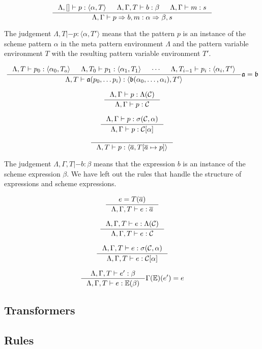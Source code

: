 \[
\inference{\Lambda, [] |- p : \langle \alpha, T \rangle &
  \Lambda, \Gamma, T |- b : \beta &
\Lambda, \Gamma |- m : s}
{\Lambda, \Gamma |- p => b, m : \alpha => \beta, s}
\]

The judgement $\Lambda, T |- p : \langle \alpha, T' \rangle$ means that the
pattern $p$ is an instance of the scheme pattern $\alpha$ in the meta pattern
environment $\Lambda$ and the pattern variable environment $T$ with the
resulting pattern variable environment $T'$.

\[
\inference{\Lambda, T |- p_0 : \langle \alpha_0, T_o \rangle &
\Lambda, T_0 |- p_1 : \langle \alpha_1, T_1 \rangle &
\cdots &
\Lambda, T_{i-1} |- p_i : \langle \alpha_i, T' \rangle
}
{\Lambda, T |- \mathfrak{a}(p_0, \ldots p_i) : \langle \mathfrak{b}(\alpha_0,
  \ldots, \alpha_i), T' \rangle}
{\mathfrak{a} = \mathfrak{b}}
\]

\[
\inference
{\Lambda, \Gamma |- p : \Lambda(\mathcal{C})}
{\Lambda, \Gamma |- p : \mathcal{C}}
\]

\[
\inference
{\Lambda, \Gamma |- p : \sigma(\mathcal{C}, \alpha)}
{\Lambda, \Gamma |- p : \mathcal{C}[\alpha]}
\]

\[
\inference{}
{\Lambda, T |- p : \langle \overline{a}, T[\overline{a} \mapsto p] \rangle}
\]

The judgement $\Lambda, \Gamma, T |- b : \beta$ means that the expression $b$ is
an instance of the scheme expression $\beta$. We have left out the rules that
handle the structure of expressions and scheme expressions.

\[
\inference{e = T(\overline{a})}
{\Lambda, \Gamma, T |- e : \overline{a}}
\]

\[
\inference{\Lambda, \Gamma, T |- e : \Lambda(\mathcal{C})}
{\Lambda, \Gamma, T |- e : \mathcal{C}}
\]

\[
\inference
{\Lambda, \Gamma, T |- e : \sigma(\mathcal{C}, \alpha)}
{\Lambda, \Gamma, T |- e : \mathcal{C}[\alpha]}
\]

\[
\inference{\Lambda, \Gamma, T |- e' : \beta}
{\Lambda, \Gamma, T |- e : \mathbb{E}(\beta)}{\Gamma(\mathbb{E})(e') = e}
\]

\subsection{Transformers}

\subsection{Rules}





